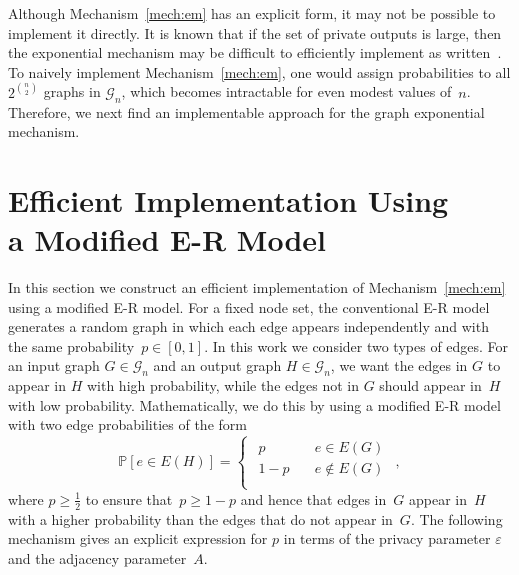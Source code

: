 \documentclass[conference]{ieeeconf}
\newtheorem{remark}{Remark}
\newcommand{\G}{\mathcal{G}}
\newcommand{\Prob}{\mathbb{P}}
\begin{document}


Although Mechanism~\ref{mech:em} has an explicit form, it may not be possible to implement it directly.
It is known that
if the set of private outputs is large,
then the exponential mechanism may be difficult to efficiently implement as written~\cite[Section 3.4]{dwork2014algorithmic}. 
To naively
implement Mechanism~\ref{mech:em}, one would assign probabilities to all $2^{\binom{n}{2}}$ graphs in $\mathcal{G}_n$,
which becomes intractable for even modest values of~$n$. 
Therefore, we next find an implementable approach for the graph exponential mechanism.

\ActivateWarningFilters[sectiontitles]
\section{Efficient Implementation Using \\ a Modified E-R Model} \label{sec:eff_mech}
\DeactivateWarningFilters[sectiontitles]
In this section we construct an efficient implementation of Mechanism~\ref{mech:em} using a modified E-R model.
For a fixed node set, the conventional E-R model~\cite{erdds1959random}
generates a random graph in which each edge 
appears independently and with the 
same probability~$p \in [0, 1]$. In this work we consider two types of edges. 
For an input graph $G \in \G_n$ and an output graph $H\in\G_n$, we want the edges in $G$ to appear in $H$ with high probability, while the edges not in $G$ should 
appear in~$H$ with low probability. 
Mathematically, we do this by using a modified E-R model with two edge probabilities of the form 
\begin{equation} \label{eq:P_eH1}
\Prob[e\in E(H)]=\begin{cases}
\begin{aligned}
    p \quad &e\in E(G)\\
    1-p \quad &e\notin E(G)\\
\end{aligned}
\end{cases}, 
\end{equation}
where $p \geq \frac{1}{2}$ to ensure that~$p \geq 1 - p$ and hence that edges
in~$G$ appear in~$H$ with a higher probability than the edges that do not appear in~$G$.
The following mechanism gives an explicit expression for $p$ in terms of the privacy parameter $\varepsilon$ and the adjacency parameter~$A$.
\end{document}
